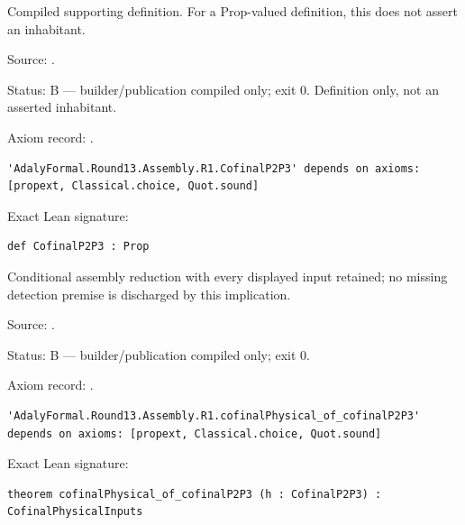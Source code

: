 \begin{definition}[bp-552]
\label{bp-552}
\leanok
Compiled supporting definition. For a Prop-valued definition, this does not assert an inhabitant.

\par Source: \texttt{}.
\par Status: B — builder/publication compiled only; exit 0. Definition only, not an asserted inhabitant.
\par Axiom record: \texttt{}.
\begin{verbatim}
'AdalyFormal.Round13.Assembly.R1.CofinalP2P3' depends on axioms: [propext, Classical.choice, Quot.sound]
\end{verbatim}
\par Exact Lean signature:
\begin{verbatim}
def CofinalP2P3 : Prop
\end{verbatim}
\end{definition}

\begin{theorem}[bp-553]
\label{bp-553}
\leanok
Conditional assembly reduction with every displayed input retained; no missing detection premise is discharged by this implication.

\par Source: \texttt{}.
\par Status: B — builder/publication compiled only; exit 0.
\par Axiom record: \texttt{}.
\begin{verbatim}
'AdalyFormal.Round13.Assembly.R1.cofinalPhysical_of_cofinalP2P3' depends on axioms: [propext, Classical.choice, Quot.sound]
\end{verbatim}
\par Exact Lean signature:
\begin{verbatim}
theorem cofinalPhysical_of_cofinalP2P3 (h : CofinalP2P3) : CofinalPhysicalInputs
\end{verbatim}
\end{theorem}

